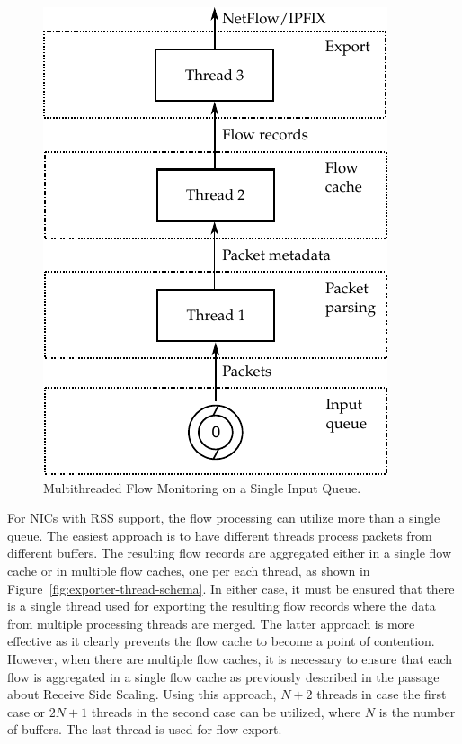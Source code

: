 \begin{figure}[t!]
  \begin{center}
    \includegraphics{figures/c05/exporter-thread-noRSS}
  \end{center}
  \caption{Multithreaded Flow Monitoring on a Single Input Queue.}
  \label{fig:exporter-thread-noRSS}
\end{figure}


For NICs with RSS support, the flow processing can utilize more than a single queue. The easiest approach is to have different threads process packets from different buffers. The resulting flow records are aggregated either in a single flow cache or in multiple flow caches, one per each thread, as shown in Figure~\ref{fig:exporter-thread-schema}. In either case, it must be ensured that there is a single thread used for exporting the resulting flow records where the data from multiple processing threads are merged. The latter approach is more effective as it clearly prevents the flow cache to become a point of contention. However, when there are multiple flow caches, it is necessary to ensure that each flow is aggregated in a single flow cache as previously described in the passage about Receive Side Scaling. Using this approach, $N+2$ threads in case the first case or $2N+1$ threads in the second case can be utilized, where $N$ is the number of buffers. The last thread is used for flow export. 

